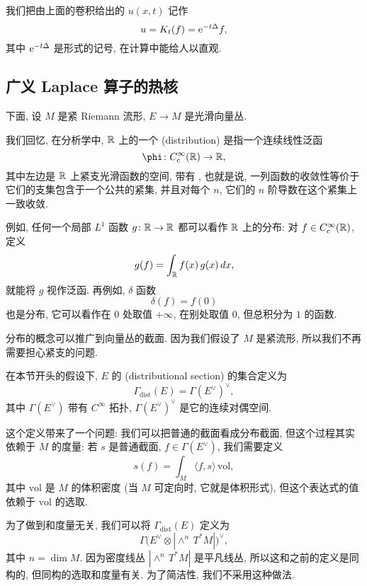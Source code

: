 我们把由上面的卷积给出的 $u (x, t)$ 记作
\[ u = K_t (f) = \mathrm{e}^{-t \Delta} f, \]
其中 $\mathrm{e}^{-t \Delta}$ 是形式的记号, 在计算中能给人以直观.


\subsection{广义 Laplace 算子的热核}

下面, 设 $M$ 是紧 Riemann 流形, $E \to M$ 是光滑向量丛.

我们回忆, 在分析学中, $\mathbb{R}$ 上的一个 (distribution)
是指一个连续线性泛函
\[ \phi \: C_{\mathrm{c}}^\infty (\bbR) \to \bbR, \]
其中左边是 $\mathbb{R}$ 上紧支光滑函数的空间, 带有 ,
也就是说, 一列函数的收敛性等价于它们的支集包含于一个公共的紧集,
并且对每个 $n$, 它们的 $n$ 阶导数在这个紧集上一致收敛.

例如, 任何一个局部 $L^1$ 函数 $g \colon \mathbb{R} \to \mathbb{R}$ 都可以看作 $\mathbb{R}$ 上的分布:
对 $f \in C_{\mathrm{c}}^\infty (\mathbb{R})$, 定义
\[ g (f) = \int_{\mathbb{R}} f(x) \, g(x) \, dx, \]
就能将 $g$ 视作泛函. 再例如, $\delta$ 函数
\[ \delta (f) = f (0) \]
也是分布, 它可以看作在 $0$ 处取值 $+\infty$, 在别处取值 $0$, 但总积分为 $1$ 的函数.

分布的概念可以推广到向量丛的截面.
因为我们假设了 $M$ 是紧流形, 所以我们不再需要担心紧支的问题.

\begin{definition}
    在本节开头的假设下, $E$ 的 (distributional section) 的集合定义为
    \[ \Gamma_{\mathrm{dist}} (E) = \Gamma (E^\vee) ^\vee, \]
    其中 $\Gamma (E^\vee)$ 带有 $C^\infty$ 拓扑,
    $\Gamma (E^\vee) ^\vee$ 是它的连续对偶空间.
\end{definition}

\begin{remark}
    这个定义带来了一个问题: 我们可以把普通的截面看成分布截面,
    但这个过程其实依赖于 $M$ 的度量: 若 $s$ 是普通截面, $f \in \Gamma(E^{\vee})$,
    我们需要定义
    \[ s(f) = \int_M \langle f, s \rangle \, \mathrm{vol} , \]
    其中 $\mathrm{vol}$ 是 $M$ 的体积密度
    (当 $M$ 可定向时, 它就是体积形式), 
    但这个表达式的值依赖于 $\mathrm{vol}$ 的选取.
    
    为了做到和度量无关, 我们可以将 $\Gamma_{\mathrm{dist}} (E)$ 定义为
    \[ \Gamma \bigl( E^\vee \otimes |{\wedge^n \, T^* M}| \bigr) ^\vee, \]
    其中 $n = \dim M$. 因为密度线丛 $|{\wedge^n \, T^* M}|$ 是平凡线丛,
    所以这和之前的定义是同构的, 但同构的选取和度量有关.
    为了简洁性, 我们不采用这种做法. \varqed
\end{remark}

